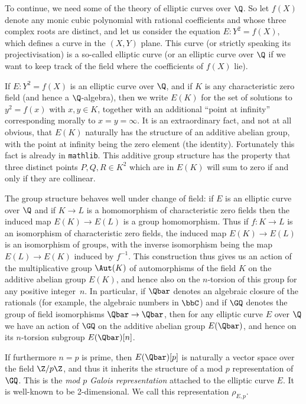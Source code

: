 To continue, we need some of the theory of elliptic curves over $\Q$. So let $f(X)$ denote any
monic cubic polynomial with rational coefficients and whose three complex roots are distinct,
and let us consider the equation $E:Y^2=f(X)$, which defines a curve in the $(X,Y)$ plane.
This curve (or strictly speaking its projectivisation) is a so-called elliptic curve
(or an elliptic curve over $\Q$ if we want to keep track of the field where the coefficients
of $f(X)$ lie).

If $E:Y^2=f(X)$ is an elliptic curve over $\Q$, and if $K$ is any characteristic zero field (and
hence a $\Q$-algebra), then we write $E(K)$ for the set of solutions to $y^2=f(x)$ with $x,y\in K$,
together with an additional ``point at infinity'' corresponding morally to $x=y=\infty$.
It is an extraordinary fact,
and not at all obvious, that $E(K)$ naturally has the structure of an additive abelian group,
with the point at infinity being the zero element (the identity). Fortunately this fact is
already in {\tt mathlib}. This additive group structure has
the property that three distinct points $P,Q,R\in K^2$ which are in $E(K)$ will sum to zero
if and only if they are collinear.

The group structure behaves well under change of field: if $E$ is an elliptic curve over $\Q$
and if $K\to L$ is a homomorphism of
characteristic zero fields then the induced map $E(K)\to E(L)$ is a group homomorphism.
Thus if $f:K\to L$ is an isomorphism of characteristic zero fields, the induced map $E(K)\to E(L)$
is an isomorphism of groups, with the inverse isomorphism being the map $E(L)\to E(K)$ induced
by $f^{-1}$. This construction thus gives us an action of the multiplicative group $\Aut(K)$
of automorphisms of the field $K$ on the additive abelian group $E(K)$, and hence also
on the $n$-torsion of this group for any positive integer~$n$.
In particular, if $\Qbar$ denotes an algebraic closure of the
rationals (for example, the algebraic numbers in $\bbC$) and if $\GQ$ denotes the group of field
isomorphisms $\Qbar\to\Qbar$, then for any elliptic curve $E$ over $\Q$ we have an action
of $\GQ$ on the additive abelian group $E(\Qbar)$, and hence on its $n$-torsion subgroup
$E(\Qbar)[n]$.

If furthermore $n=p$ is prime, then $E(\Qbar)[p]$ is naturally a vector space over the
field $\Z/p\Z$, and thus it inherits the structure of a mod $p$ representation of $\GQ$.
This is the \emph{mod $p$ Galois representation} attached to the elliptic curve $E$.
It is well-known to be 2-dimensional. We call this representation $\rho_{E,p}$.

